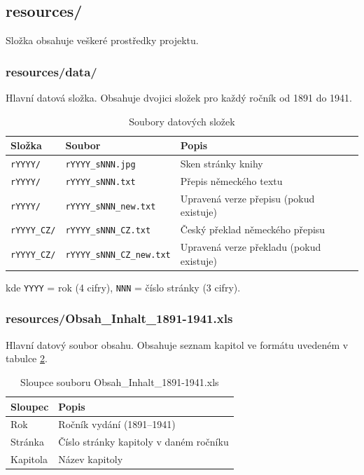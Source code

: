 \documentclass[FM,Proj]{tulthesis}
\begin{document}
\clearpage
\subsection{resources/}

Složka obsahuje veškeré prostředky projektu.

\subsubsection{resources/data/}
Hlavní datová složka. Obsahuje dvojici složek pro každý ročník od 1891 do 1941.

\begin{table}[H]
	\centering
	\caption{Soubory datových složek}
	\begin{tabularx}{\textwidth}{|l|l|X|}
		\hline
		\textbf{Složka} & \textbf{Soubor} & \textbf{Popis} \\ \hline
		\texttt{rYYYY/} & \texttt{rYYYY\_sNNN.jpg} & Sken stránky knihy \\ \hline
		\texttt{rYYYY/} & \texttt{rYYYY\_sNNN.txt} & Přepis německého textu \\ \hline
		\texttt{rYYYY/} & \texttt{rYYYY\_sNNN\_new.txt} & Upravená verze přepisu (pokud existuje) \\ \hline
		\texttt{rYYYY\_CZ/} & \texttt{rYYYY\_sNNN\_CZ.txt} & Český překlad německého přepisu \\ \hline
		\texttt{rYYYY\_CZ/} & \texttt{rYYYY\_sNNN\_CZ\_new.txt} & Upravená verze překladu (pokud existuje) \\ \hline
	\end{tabularx}
	\label{tab:data-files}
\end{table}

kde \texttt{YYYY} = rok (4 cifry), \texttt{NNN} = číslo stránky (3 cifry).

\subsubsection{resources/Obsah\_Inhalt\_1891-1941.xls}

Hlavní datový soubor obsahu. Obsahuje seznam kapitol ve formátu uvedeném
v tabulce \ref{tab:xls-columns}.

\begin{table}[H]
	\centering
	\caption{Sloupce souboru Obsah\_Inhalt\_1891-1941.xls}
	\begin{tabularx}{\textwidth}{|l|X|}
		\hline
		\textbf{Sloupec} & \textbf{Popis} \\ \hline
		Rok      & Ročník vydání (1891–1941) \\ \hline
		Stránka  & Číslo stránky kapitoly v daném ročníku \\ \hline
		Kapitola & Název kapitoly \\ \hline
	\end{tabularx}
	\label{tab:xls-columns}
\end{table}
\end{document}
